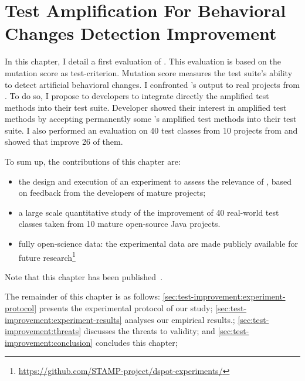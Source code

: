 \chapter{Test Amplification For Behavioral Changes Detection Improvement}
\label{chap:test-improvement}

\begin{chaptersummary}
	In this chapter, I detail a first evaluation of \dspot. 
	This evaluation is based on the mutation score as test-criterion.
	Mutation score measures the test suite's ability to detect artificial behavioral changes.
	I confronted \dspot's output to real projects from \gh.
	To do so, I propose to developers to integrate directly the amplified test methods into their test suite.
	Developer showed their interest in amplified test methods by accepting permanently some \dspot's amplified test methods into their test suite.
	I also performed an evaluation on 40 test classes from 10 projects from \gh and showed that \dspot improve 26 of them.
 
 	To sum up, the contributions of this chapter are:
	\begin{itemize}
		\item the design and execution of an experiment to assess the relevance of \dspot, based on feedback from the developers of mature projects;
		\item a large scale quantitative study of the improvement of 40 real-world test classes taken from 10 mature open-source Java projects.	
		\item fully open-science data: the experimental data are made publicly available for future research\footnote{\url{https://github.com/STAMP-project/dspot-experiments/}}
	\end{itemize}
	Note that this chapter has been published~\cite{Danglot2019}.
	
	The remainder of this chapter is as follows:
	\autoref{sec:test-improvement:experiment-protocol} presents the experimental protocol of our study;
	\autoref{sec:test-improvement:experiment-results} analyses our empirical results.;
	\autoref{sec:test-improvement:threats} discusses the threats to validity;
	and \autoref{sec:test-improvement:conclusion} concludes this chapter;
\end{chaptersummary}

\minitoc

\graphicspath{{.}{chapitres/test-improvement/}}


